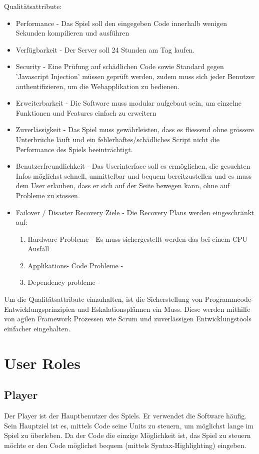 \documentclass[a4paper, 11pt]{scrartcl}
\let\oldsection\section
\renewcommand\section{\clearpage\oldsection}
\begin{document}
Qualitätsattribute:
\begin{itemize}

\item Performance - Das Spiel soll den eingegeben Code innerhalb wenigen Sekunden kompilieren und ausführen
\item Verfügbarkeit - Der Server soll 24 Stunden am Tag laufen.
\item Security - Eine Prüfung auf schädlichen Code sowie Standard gegen 'Javascript Injection' müssen geprüft werden, zudem muss sich jeder Benutzer authentifizieren, um die Webapplikation zu bedienen.
\item Erweiterbarkeit - Die Software muss modular aufgebaut sein, um einzelne Funktionen und Features einfach zu erweitern
\item Zuverlässigkeit - Das Spiel muss gewährleisten, dass es fliessend ohne grössere Unterbrüche läuft und ein fehlerhaftes/schädliches Script nicht die Performance des Spiels beeinträchtigt.
\item Benutzerfreundlichkeit - Das Userinterface soll es ermöglichen, die gesuchten Infos möglichst schnell, unmittelbar und bequem bereitzustellen und es muss dem User erlauben, dass er sich auf der Seite bewegen kann, ohne auf Probleme zu stossen.
\item Failover / Disaster Recovery Ziele - Die Recovery Plans werden eingeschränkt auf:
\begin{enumerate}
\item Hardware Probleme - Es muss sichergestellt werden das bei einem CPU Ausfall
\item Applikations- Code Probleme -
\item Dependency probleme -
\end{enumerate}

\end{itemize}

Um die Qualitätsattribute einzuhalten, ist die Sicherstellung von Programmcode-Entwicklungsprinzipien und Eskalationsplännen ein Muss. Diese werden mithilfe von agilen Framework Prozessen wie Scrum und zuverlässigen Entwicklungstools einfacher eingehalten.

\section{User Roles}
\subsection{Player}
Der Player ist der Hauptbenutzer des Spiels. Er verwendet die Software häufig. Sein Hauptziel ist es, mittels Code seine Units zu steuern, um möglichst lange im Spiel zu überleben. Da der Code die einzige Möglichkeit ist, das Spiel zu steuern möchte er den Code möglichst bequem (mittels Syntax-Highlighting) eingeben.
\end{document}
